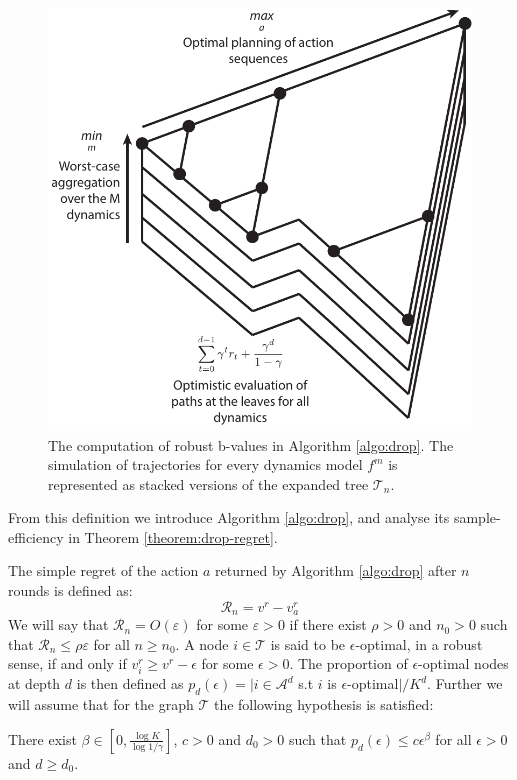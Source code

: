 \documentclass{article}
\begin{document}
\begin{figure}
\centering
\includegraphics[width=0.4\linewidth]{img/robust-control-tree}
\caption{The computation of robust b-values in Algorithm \ref{algo:drop}. The simulation of trajectories for every dynamics model $f^m$ is represented as stacked versions of the expanded tree $\mathcal{T}_n$.}
\label{fig:drop}
\end{figure}

From this definition we introduce Algorithm \ref{algo:drop}, and analyse its sample-efficiency in Theorem \ref{theorem:drop-regret}.


The simple regret of the action $a$ returned by Algorithm \ref{algo:drop} after $n$ rounds is defined as:
\begin{equation}
\mathcal{R}_n = v^r - v_a^r
\end{equation}
We will say that $\mathcal{R}_n=O(\varepsilon)$ for some $\varepsilon>0$ if there exist $\rho>0$ and $n_0>0$ such that $\mathcal{R}_n\leq\rho\varepsilon$ for all $n\geq n_0$.
A node $i\in\mathcal{T}$ is said to be $\epsilon$-optimal, in a robust sense, if and only if $v_i^r \geq v^r - \epsilon$ for some $\epsilon > 0$. The proportion of $\epsilon$-optimal nodes at depth $d$ is then defined as $p_d(\epsilon) = |i \in \mathcal{A}^d$ s.t $i$ is $\epsilon$-optimal$|/K^d$. Further we will assume that for the graph $\mathcal{T}$ the following hypothesis is satisfied:
\begin{assumption}
\label{assumpt:beta}
There exist $\beta\in[0, \frac{\log K}{\log 1/\gamma}]$, $c > 0$ and $d_0 > 0$ such that $p_d(\epsilon)\leq c\epsilon^\beta$ for all $\epsilon > 0$ and $d\geq d_0$.
\end{assumption}
\end{document}
